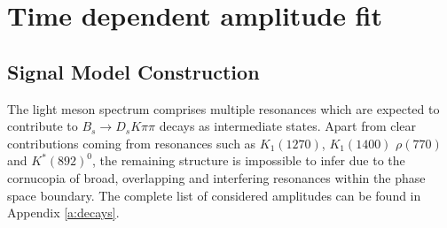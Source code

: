 \section{Time dependent amplitude fit}
\label{sec:fullFit}


\subsection{Signal Model Construction}
\label{sec:LASSO}

The light meson spectrum comprises multiple resonances which are expected to contribute to $B_s \to D_s K \pi \pi$  decays as intermediate states. 
Apart from clear contributions coming from resonances such as $K_{1}(1270)$, $K_{1}(1400)$ $\rho(770)$ and $K^*(892)^0$, 
the remaining structure is impossible to infer due to
the cornucopia of broad, overlapping and interfering resonances 
within the phase space boundary.
The complete list of considered amplitudes can be found in Appendix \ref{a:decays}.

